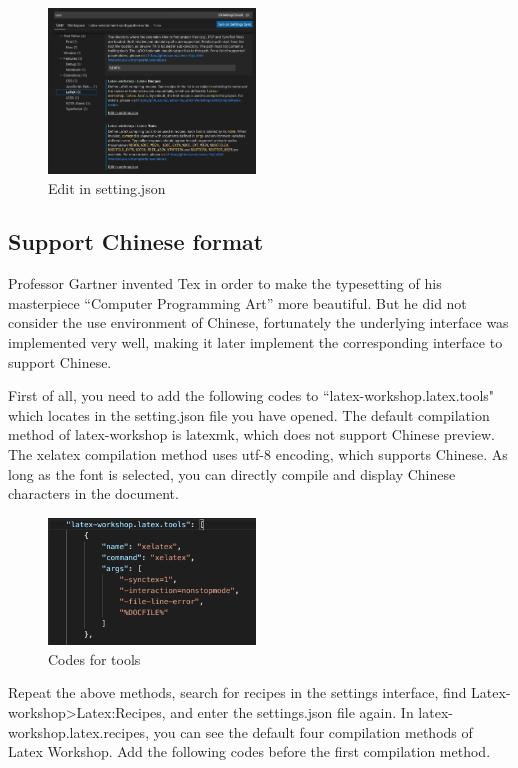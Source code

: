 \documentclass[conference]{IEEEtran}
\begin{document}
\begin{figure}[htbp]
    \centerline{\includegraphics[width=0.49\textwidth]{show_tools.png}}
    \caption{Edit in setting.json}
    \label{fig1}
\end{figure}

\subsection{Support Chinese format}
Professor Gartner invented Tex in order to make the typesetting of his masterpiece ``Computer Programming Art'' more beautiful. 
But he did not consider the use environment of Chinese, 
fortunately the underlying interface was implemented very well, 
making it later implement the corresponding interface to support Chinese.

First of all, you need to add the following codes to ``latex-workshop.latex.tools" which locates in the setting.json file you have opened.
The default compilation method of latex-workshop is latexmk, which does not support Chinese preview. 
The xelatex compilation method uses utf-8 encoding, which supports Chinese. 
As long as the font is selected, you can directly compile and display Chinese characters in the document.

\begin{figure}[htbp]
    \centerline{\includegraphics[width=0.49\textwidth]{tool_xelatex.png}}
    \caption{Codes for tools}
    \label{fig2}
\end{figure}

Repeat the above methods, 
search for recipes in the settings interface, 
find Latex-workshop>Latex:Recipes, 
and enter the settings.json file again. 
In latex-workshop.latex.recipes, 
you can see the default four compilation methods of Latex Workshop. 
Add the following codes before the first compilation method.
\end{document}
